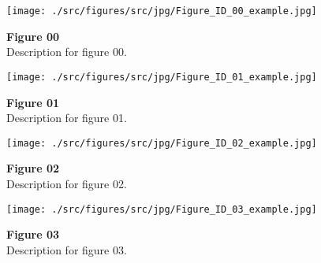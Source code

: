 

\clearpage
\begin{figure*}[p]
    \centering
    \texttt{[image: ./src/figures/src/jpg/Figure\_ID\_00\_example.jpg]}
    \caption{
\textbf{
Figure 00
}
\smallskip
\\
Description for figure 00.
}
    \label{fig:00_example}
\end{figure*}

\clearpage
\begin{figure*}[p]
    \centering
    \texttt{[image: ./src/figures/src/jpg/Figure\_ID\_01\_example.jpg]}
    \caption{
\textbf{
Figure 01
}
\smallskip
\\
Description for figure 01.
}
    \label{fig:01_example}
\end{figure*}

\clearpage
\begin{figure*}[p]
    \centering
    \texttt{[image: ./src/figures/src/jpg/Figure\_ID\_02\_example.jpg]}
    \caption{
\textbf{
Figure 02
}
\smallskip
\\
Description for figure 02.
}
    \label{fig:02_example}
\end{figure*}

\clearpage
\begin{figure*}[p]
    \centering
    \texttt{[image: ./src/figures/src/jpg/Figure\_ID\_03\_example.jpg]}
    \caption{
\textbf{
Figure 03
}
\smallskip
\\
Description for figure 03.
}
    \label{fig:03_example}
\end{figure*}

